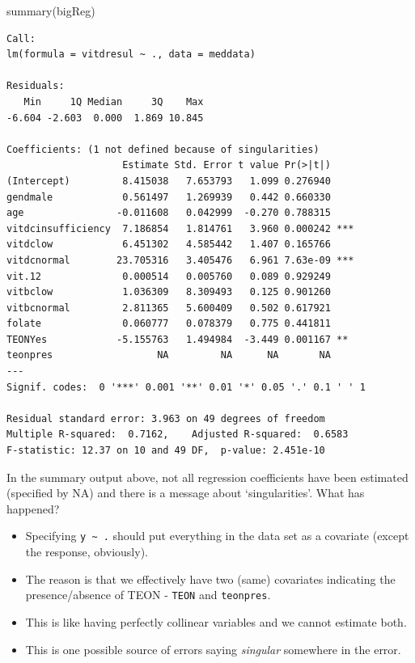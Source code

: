 \documentclass[
  oneside]{krantz}
\newenvironment{Shaded}{\begin{snugshade}}{\end{snugshade}}
\newcommand{\FunctionTok}[1]{\textcolor[rgb]{0.00,0.00,0.00}{#1}}
\newcommand{\NormalTok}[1]{#1}
\providecommand{\tightlist}{%
  \setlength{\itemsep}{0pt}\setlength{\parskip}{0pt}}
\begin{document}
\begin{Shaded}
\begin{Highlighting}[]
\FunctionTok{summary}\NormalTok{(bigReg)}
\end{Highlighting}
\end{Shaded}

\begin{verbatim}
Call:
lm(formula = vitdresul ~ ., data = meddata)

Residuals:
   Min     1Q Median     3Q    Max 
-6.604 -2.603  0.000  1.869 10.845 

Coefficients: (1 not defined because of singularities)
                    Estimate Std. Error t value Pr(>|t|)    
(Intercept)         8.415038   7.653793   1.099 0.276940    
gendmale            0.561497   1.269939   0.442 0.660330    
age                -0.011608   0.042999  -0.270 0.788315    
vitdcinsufficiency  7.186854   1.814761   3.960 0.000242 ***
vitdclow            6.451302   4.585442   1.407 0.165766    
vitdcnormal        23.705316   3.405476   6.961 7.63e-09 ***
vit.12              0.000514   0.005760   0.089 0.929249    
vitbclow            1.036309   8.309493   0.125 0.901260    
vitbcnormal         2.811365   5.600409   0.502 0.617921    
folate              0.060777   0.078379   0.775 0.441811    
TEONYes            -5.155763   1.494984  -3.449 0.001167 ** 
teonpres                  NA         NA      NA       NA    
---
Signif. codes:  0 '***' 0.001 '**' 0.01 '*' 0.05 '.' 0.1 ' ' 1

Residual standard error: 3.963 on 49 degrees of freedom
Multiple R-squared:  0.7162,    Adjusted R-squared:  0.6583 
F-statistic: 12.37 on 10 and 49 DF,  p-value: 2.451e-10
\end{verbatim}

In the summary output above, not all regression coefficients have been estimated (specified by NA) and there is a message about `singularities'. What has happened?

\begin{itemize}
\tightlist
\item
  Specifying \texttt{y\ \textasciitilde{}\ .} should put everything in the data set as a covariate (except the response, obviously).
\item
  The reason is that we effectively have two (same) covariates indicating the presence/absence of TEON - \texttt{TEON} and \texttt{teonpres}.
\item
  This is like having perfectly collinear variables and we cannot estimate both.
\item
  This is one possible source of errors saying \emph{singular} somewhere in the error.
\end{itemize}
\end{document}
